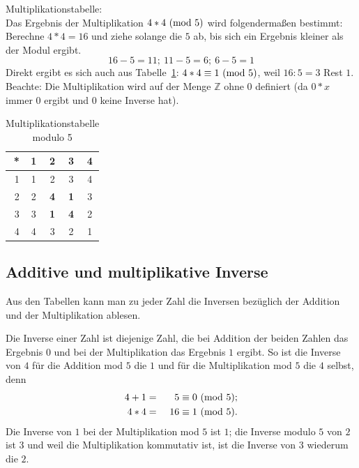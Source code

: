 \begin{refsegment}
\begin{example}{ Multiplikationstabelle:}\\
Das Ergebnis der Multiplikation $4 * 4 {\rm ~(mod~ } 5)$ wird folgendermaßen
bestimmt: Berechne $ 4*4=16$ und ziehe solange die $5$ ab, bis sich ein
Ergebnis kleiner als der Modul ergibt.
$$16 - 5 = 11;~ 11 - 5 = 6;~6- 5 = 1$$
Direkt ergibt es sich auch aus Tabelle~\ref{mulmod5}: $4 * 4 \equiv
1 {\rm ~(mod~} 5)$, weil $16 : 5 = 3$ Rest $1$.\\
Beachte: Die Multiplikation wird auf der Menge $\mathbb{Z}$ ohne $0$ definiert
(da $0*x$ immer $0$ ergibt und $0$ keine Inverse hat).

\begin{table}[ht]
\begin{center}
\begin{tabular}{r|cccc}
* & 1& 2 & 3 & 4\\
\hline
1 & 1 &    2    &    3    & 4\\
2 & 2 & {\bf 4} & {\bf 1} & 3\\
3 & 3 & {\bf 1} & {\bf 4} & 2\\
4 & 4 &    3    &    2    & 1
\end{tabular}
\end{center}
\caption{Multiplikationstabelle modulo 5}
\label{mulmod5}
\end{table}
\end{example}


\subsection{Additive und multiplikative Inverse}
\label{add-and-mult-inverses}\label{multmodn}
 

Aus den Tabellen kann man zu jeder Zahl die Inversen bezüglich der Addition
und der Multiplikation ablesen.

Die Inverse einer Zahl ist diejenige Zahl, die bei Addition der beiden
Zahlen das Ergebnis $0$ und bei der Multiplikation das Ergebnis $1$ ergibt. So
ist die Inverse von $4$ für die Addition mod $5$ die $1$ und für die
Multiplikation mod $5$ die $4$ selbst, denn
\begin{alignat}{2}
4 + 1 &  =  & 5 & \equiv 0 {\rm ~(mod~ } 5); \nonumber\\
4 * 4 &  = & ~16 & \equiv 1 {\rm ~(mod~ } 5). \nonumber
\end{alignat}
Die Inverse von $1$ bei der Multiplikation mod $5$ ist $1$; die Inverse modulo $5$
von $2$ ist $3$ und weil die Multiplikation kommutativ ist, ist die Inverse von
$3$ wiederum die $2$.


\end{refsegment}
